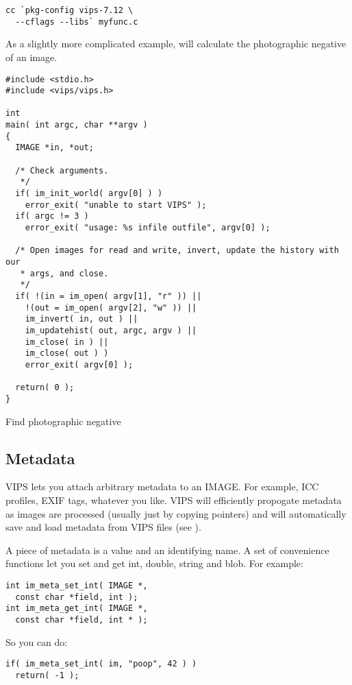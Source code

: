 \begin{verbatim}
cc `pkg-config vips-7.12 \
  --cflags --libs` myfunc.c 
\end{verbatim}

As a slightly more complicated example, 
will calculate the photographic negative of an image.

\begin{fig2}
\begin{verbatim}
#include <stdio.h>
#include <vips/vips.h>

int
main( int argc, char **argv )
{
  IMAGE *in, *out;

  /* Check arguments.
   */
  if( im_init_world( argv[0] ) )
    error_exit( "unable to start VIPS" );
  if( argc != 3 )
    error_exit( "usage: %s infile outfile", argv[0] );

  /* Open images for read and write, invert, update the history with our
   * args, and close.
   */
  if( !(in = im_open( argv[1], "r" )) ||
    !(out = im_open( argv[2], "w" )) ||
    im_invert( in, out ) ||
    im_updatehist( out, argc, argv ) ||
    im_close( in ) || 
    im_close( out ) )
    error_exit( argv[0] );
  
  return( 0 );
}
\end{verbatim}
\label{fg:negative}
\caption{Find photographic negative}
\end{fig2}

\subsection{Metadata}
\label{sec:meta}

VIPS lets you attach arbitrary metadata to an IMAGE. For example, ICC
profiles, EXIF tags, whatever you like. VIPS will efficiently propogate
metadata as images are processed (usually just by copying pointers) and will
automatically save and load metadata from VIPS files (see
).

A piece of metadata is a value and an identifying name. A set of
convenience functions let you set and get int, double, string and blob. For
example:

\begin{verbatim}
int im_meta_set_int( IMAGE *,
  const char *field, int );
int im_meta_get_int( IMAGE *,
  const char *field, int * );
\end{verbatim}

So you can do:

\begin{verbatim}
if( im_meta_set_int( im, "poop", 42 ) )
  return( -1 );
\end{verbatim}

